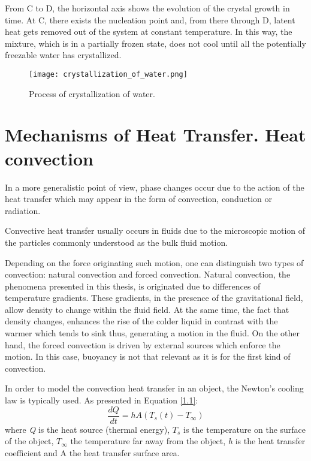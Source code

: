 \noindent From C to D, the horizontal axis shows the evolution of the crystal growth in time. At C, there exists the nucleation point and, from there through D, latent heat gets removed out of the system at constant temperature. In this way, the mixture, which is in a partially frozen state, does not cool until all the potentially freezable water has crystallized.
\clearpage

\begin{figure}[h]
	\centering
	\texttt{[image: crystallization\_of\_water.png]}
	\caption{Process of crystallization of water.}
	\label{1.7fig}	
\end{figure} 


\section{Mechanisms of Heat Transfer. Heat convection}

\setlength{\parindent}{0.5cm} In a more generalistic point of view, phase changes occur due to the action of the heat transfer which may appear in the form of convection, conduction or radiation. 

\noindent Convective heat transfer usually occurs in fluids due to the microscopic motion of the particles commonly understood as the bulk fluid motion.

\noindent Depending on the force originating such motion, one can distinguish two types of convection: natural convection and forced convection. Natural convection, the phenomena presented in this thesis, is originated due to differences of temperature gradients. These gradients, in the presence of the gravitational field, allow density to change within the fluid field. At the same time, the fact that density changes, enhances the rise of the colder liquid in contrast with the warmer which tends to sink thus, generating a motion in the fluid. On the other hand, the forced convection is driven by external sources which enforce the motion. In this case, buoyancy is not that relevant as it is for the first kind of convection. 

\noindent In order to model the convection heat transfer in an object, the Newton's cooling law is typically used. As presented in Equation \ref{1.1}:
\begin{equation}
\frac{d Q}{d t}=h A\left(T_{s}(t)-T_{\infty}\right)
\label{1.1}
\end{equation}
where \textit{Q} is the heat source (thermal energy), $T_s$ is the temperature on the surface of the object, $T_{\infty}$ the temperature far away from the object, \textit{h} is the heat transfer coefficient and A the heat transfer surface area.

